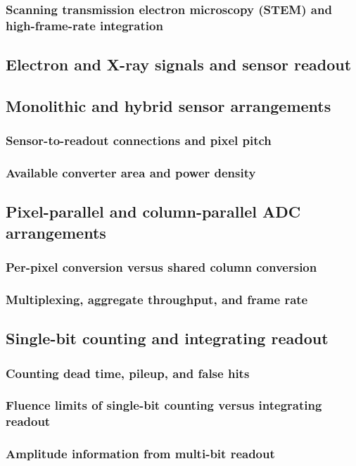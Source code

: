 \documentclass[PhD, UKenglish]{scrbook}
\begin{document}
\subsubsection{Scanning transmission electron microscopy (STEM) and high-frame-rate integration}
\subsection{Electron and X-ray signals and sensor readout}
\subsection{Monolithic and hybrid sensor arrangements}
\subsubsection{Sensor-to-readout connections and pixel pitch}
\subsubsection{Available converter area and power density}
\subsection{Pixel-parallel and column-parallel ADC arrangements}
\subsubsection{Per-pixel conversion versus shared column conversion}
\subsubsection{Multiplexing, aggregate throughput, and frame rate}
\subsection{Single-bit counting and integrating readout}
\subsubsection{Counting dead time, pileup, and false hits}
\subsubsection{Fluence limits of single-bit counting versus integrating readout}
\subsubsection{Amplitude information from multi-bit readout}
\end{document}
